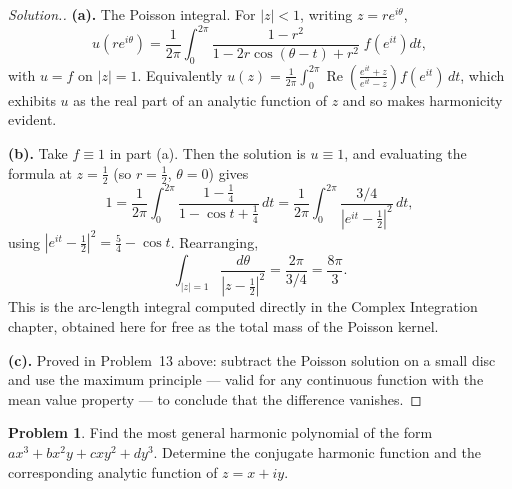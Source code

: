 \documentclass[11pt,a4paper]{article}
\theoremstyle{definition}
\newtheorem{problemx}{Problem}[section]
\newenvironment{problem}{\begin{problemx}}{\end{problemx}}
\newenvironment{solution}
  {\renewcommand{\qedsymbol}{}\begin{proof}[\textit{Solution}.]}
  {\end{proof}}
\begin{document}
\begin{solution}
\textbf{(a).} The Poisson integral. For $\left|z\right| < 1$, writing
$z = re^{i\theta}$,
$$u\!\left(re^{i\theta}\right)
= \frac{1}{2\pi}\int^{2\pi}_{0}
\frac{1-r^{2}}{1 - 2r\cos(\theta-t) + r^{2}}\; f\!\left(e^{it}\right)dt,$$
with $u = f$ on $\left|z\right| = 1$. Equivalently
$u(z) = \frac{1}{2\pi}\int_0^{2\pi}\operatorname{Re}\!\left(\frac{e^{it}+z}{e^{it}-z}\right)f(e^{it})\,dt$,
which exhibits $u$ as the real part of an analytic function of $z$ and so makes
harmonicity evident.

\textbf{(b).} Take $f \equiv 1$ in part (a). Then the solution is $u \equiv 1$,
and evaluating the formula at $z = \tfrac12$ (so $r = \tfrac12$, $\theta = 0$)
gives
$$1 = \frac{1}{2\pi}\int^{2\pi}_{0}\frac{1-\frac14}{1-\cos t+\frac14}\,dt
= \frac{1}{2\pi}\int^{2\pi}_{0}\frac{3/4}{\left|e^{it}-\frac12\right|^{2}}\,dt,$$
using $\left|e^{it}-\frac12\right|^{2} = \frac54 - \cos t$. Rearranging,
$$\int_{\left|z\right|=1}\frac{d\theta}{\left|z-\frac12\right|^{2}}
= \frac{2\pi}{3/4} = \boxed{\frac{8\pi}{3}} .$$
This is the arc-length integral computed directly in the Complex Integration
chapter, obtained here for free as the total mass of the Poisson kernel.

\textbf{(c).} Proved in Problem~13 above: subtract the Poisson solution on a small
disc and use the maximum principle --- valid for any continuous function with the
mean value property --- to conclude that the difference vanishes.
\end{solution}


\begin{problem}
Find the most general harmonic polynomial of the form
$ax^{3} + bx^{2}y + cxy^{2} + dy^{3}$. Determine the conjugate harmonic function
and the corresponding analytic function of $z = x + iy$.
\end{problem}
\end{document}
